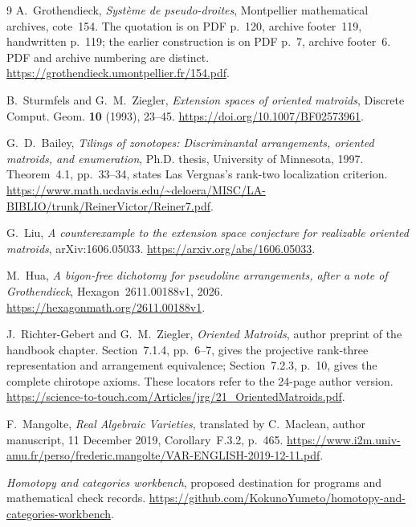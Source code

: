 \documentclass[11pt]{article}
\theoremstyle{definition}\newtheorem{definition}[theorem]{Definition}
\newcommand{\workbenchurl}{https://github.com/KokunoYumeto/homotopy-and-categories-workbench}
\begin{document}
\par\endgroup

\begin{thebibliography}{9}
A.~Grothendieck, \emph{Syst\`eme de pseudo-droites}, Montpellier
mathematical archives, cote~154. The quotation is on PDF p.~120,
archive footer~119, handwritten p.~119; the earlier construction is
on PDF p.~7, archive footer~6. PDF and archive numbering are distinct.
\url{https://grothendieck.umontpellier.fr/154.pdf}.

B.~Sturmfels and G.~M.~Ziegler, \emph{Extension spaces of oriented
matroids}, Discrete Comput. Geom. \textbf{10} (1993), 23--45.
\url{https://doi.org/10.1007/BF02573961}.

G.~D.~Bailey, \emph{Tilings of zonotopes: Discriminantal arrangements,
oriented matroids, and enumeration}, Ph.D. thesis, University of
Minnesota, 1997. Theorem~4.1, pp.~33--34, states Las Vergnas's
rank-two localization criterion.
\url{https://www.math.ucdavis.edu/~deloera/MISC/LA-BIBLIO/trunk/ReinerVictor/Reiner7.pdf}.

G.~Liu, \emph{A counterexample to the extension space conjecture for
realizable oriented matroids}, arXiv:1606.05033.
\url{https://arxiv.org/abs/1606.05033}.

M.~Hua, \emph{A bigon-free dichotomy for pseudoline arrangements,
after a note of Grothendieck}, Hexagon~2611.00188v1, 2026.
\url{https://hexagonmath.org/2611.00188v1}.

J.~Richter-Gebert and G.~M.~Ziegler, \emph{Oriented Matroids},
author preprint of the handbook chapter. Section~7.1.4, pp.~6--7,
gives the projective rank-three representation and arrangement
equivalence; Section~7.2.3, p.~10, gives the complete chirotope axioms.
These locators refer to the 24-page author version.
\url{https://science-to-touch.com/Articles/jrg/21_OrientedMatroids.pdf}.

F.~Mangolte, \emph{Real Algebraic Varieties}, translated by
C.~Maclean, author manuscript, 11 December 2019,
Corollary~F.3.2, p.~465.
\url{https://www.i2m.univ-amu.fr/perso/frederic.mangolte/VAR-ENGLISH-2019-12-11.pdf}.

\emph{Homotopy and categories workbench}, proposed destination for
programs and mathematical check records. \url{\workbenchurl}.
\end{thebibliography}
\end{document}
